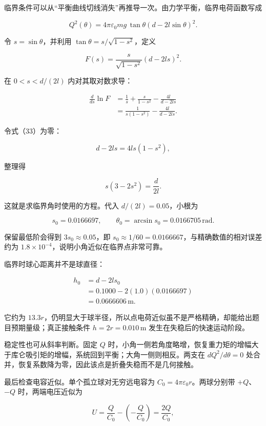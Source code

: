 \documentclass[12pt,a4paper,UTF8]{ctexart}
\begin{document}
临界条件可以从``平衡曲线切线消失''再推导一次。由力学平衡，临界电荷函数写成

\[
Q^2(\theta)=4\pi\varepsilon_0mg\,\tan\theta
\left(d-2l\sin\theta\right)^2. \tag{31}
\]

令 \(s=\sin\theta\)，并利用 \(\tan\theta=s/\sqrt{1-s^2}\)，定义

\[
F(s)=\frac{s}{\sqrt{1-s^2}}(d-2ls)^2. \tag{32}
\]

在 \(0<s<d/(2l)\) 内对其取对数求导：

\[
\begin{aligned}
\frac{d}{ds}\ln F
&=\frac1s+\frac{s}{1-s^2}-\frac{4l}{d-2ls}\\
&=\frac{1}{s(1-s^2)}-\frac{4l}{d-2ls}.
\end{aligned} \tag{33}
\]

令式（33）为零：

\[
d-2ls=4ls(1-s^2), \tag{34}
\]

整理得

\[
\boxed{s(3-2s^2)=\frac{d}{2l}}. \tag{35}
\]

这就是求临界角时使用的方程。代入 \(d/(2l)=0.05\)，小根为

\[
s_0=0.0166697,
\qquad
\theta_0=\arcsin s_0=0.0166705\,\mathrm{rad}. \tag{36}
\]

保留最低阶会得到 \(3s_0\approx0.05\)，即
\(s_0\approx1/60=0.0166667\)，与精确数值的相对误差约为
\(1.8\times10^{-4}\)，说明小角近似在临界点非常可靠。

临界时球心距离并不是球直径：

\[
\begin{aligned}
h_0
&=d-2ls_0\\
&=0.1000-2(1.0)(0.0166697)\\
&=0.0666606\,\mathrm m.
\end{aligned} \tag{37}
\]

它约为
\(13.3r\)，仍明显大于球半径，所以点电荷近似虽不是严格精确，却能给出题目预期量级；真正接触条件
\(h=2r=0.010\,\mathrm m\) 发生在失稳后的快速运动阶段。

稳定性也可从斜率判断。固定 \(Q\)
时，小角一侧若角度略增，恢复重力矩的增幅大于库仑吸引矩的增幅，系统回到平衡；大角一侧则相反。两支在
\(dQ^2/d\theta=0\)
处合并，恢复系数降为零，因此该点是折叠失稳而不是几何接触。

最后检查电容近似。单个孤立球对无穷远电容为
\(C_0=4\pi\varepsilon_0r\)。两球分别带 \(+Q\)、\(-Q\) 时，两端电压近似为

\[
U=\frac{Q}{C_0}-\left(-\frac{Q}{C_0}\right)
=\frac{2Q}{C_0}, \tag{38}
\]
\end{document}
